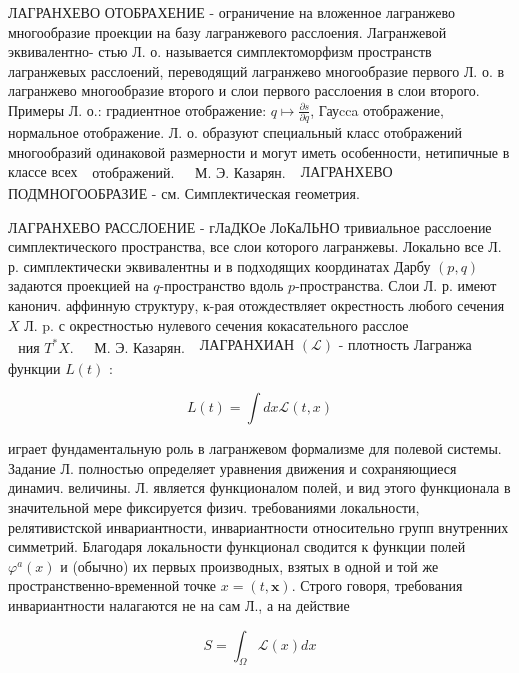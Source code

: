 \documentclass[10pt]{article}
\begin{document}
ЛАГРАНХЕВО ОТОБРАХЕНИЕ - ограничение на вложенное лагранжево многообразие проекции на базу лагранжевого расслоения. Лагранжевой эквивалентно- стью Л. о. называется симплектоморфизм пространств лагранжевых расслоений, переводящий лагранжево многообразие первого Л. о. в лагранжево многообразие второго и слои первого расслоения в слои второго. Примеры Л. о.: градиентное отображение: $q \mapsto \frac{\partial s}{\partial q}$, Гауcca отображение, нормальное отображение. Л. о. образуют специальный класс отображений многообразий одинаковой размерности и могут иметь особенности, нетипичные в классе всех $\begin{array}{ll}\text { отображений. } & \text { М. Э. Казарян. }\end{array}$ ЛАГРАНХЕВО ПОДМНОГООБРАЗИЕ - см. Симплектическая геометрия.



ЛАГРАНХЕВО РАССЛОЕНИЕ - гЛаДКОе ЛоКаЛЬНО тривиальное расслоение симплектического пространства, все слои которого лагранжевы. Локально все Л. р. симплектически эквивалентны и в подходящих координатах Дарбу $(p, q)$ задаются проекцией на $q$-пространство вдоль $p$-пространства. Слои Л. р. имеют канонич. аффинную структуру, к-рая отождествляет окрестность любого сечения $X$ Л. p. с окрестностью нулевого сечения кокасательного расслое$\begin{array}{ll}\text { ния } T^{*} X \text {. } & \text { М. Э. Казарян. }\end{array}$ ЛАГРАНХИАН $(\mathscr{L})$ - плотность Лагранжа функции $L(t)$ :



\[

L(t)=\int d x \mathscr{L}(t, x)

\]



играет фундаментальную роль в лагранжевом формализме для полевой системы. Задание Л. полностью определяет уравнения движения и сохраняющиеся динамич. величины. Л. является функционалом полей, и вид этого функционала в значительной мере фиксируется физич. требованиями локальности, релятивистской инвариантности, инвариантности относительно групп внутренних симметрий. Благодаря локальности функционал сводится к функции полей $\varphi^{a}(x)$ и (обычно) их первых производных, взятых в одной и той же пространственно-временной точке $x=(t, \boldsymbol{x})$. Строго говоря, требования инвариантности налагаются не на сам Л., а на действие



\[

S=\int_{\Omega} \mathscr{L}(x) d x

\]
\end{document}
